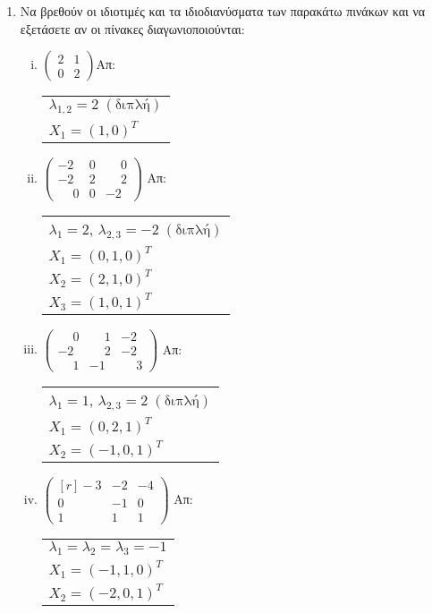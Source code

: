 \begin{enumerate}
\begin{enumerate}[i)]
\end{enumerate}

\item Να βρεθούν οι ιδιοτιμές και τα ιδιοδιανύσματα των παρακάτω πινάκων και να εξετάσετε αν οι πίνακες διαγωνιοποιούνται:

\begin{enumerate}[i)]

\item $\begin{pmatrix}
2 & 1 \\
0 & 2
\end{pmatrix}$\hfill Απ: \begin{tabular}{l}
$\lambda_{1,2}=2 \; (\text{διπλή})$ \\
$X_1=(1,0)^T$ \\
\end{tabular}

\item $\begin{pmatrix}
-2 & 0 & \phantom{-}0 \\
-2 & 2 & \phantom{-}2 \\
\phantom{-}0 & 0 & -2
\end{pmatrix}$ \hfill Απ: \begin{tabular}{l}
$\lambda_1=2$, $\lambda_{2,3}=-2 \; (\text{διπλή})$ \\ 
$X_1=(0,1,0)^T$ \\
$X_2=(2,1,0)^T$ \\
$X_3=(1,0,1)^T$
\end{tabular}



\item $\begin{pmatrix}
\phantom{-}0 & \phantom{-}1 & -2 \\
-2 & \phantom{-}2 & -2 \\
\phantom{-}1 & -1 & \phantom{-}3
\end{pmatrix}$ \hfill Απ: \begin{tabular}{l}
$\lambda_1=1$, $\lambda_{2,3}=2 \; (\text{διπλή})$ \\ 
$X_1=(0,2,1)^T$ \\
$X_2=(-1,0,1)^T$ \\
\end{tabular}

\item $ \begin{pmatrix*}[r]
		-3 & -2 & -4 \\
		0 & -1 & 0 \\
		1 & 1 & 1 
\end{pmatrix*}$ \hfill Απ: \begin{tabular}{l}
$ \lambda_{1} = \lambda_{2} = \lambda_{3} = -1 $ \\
$ X_{1} = (-1,1,0)^T$ \\
$ X_{2} = (-2,0,1)^{T} $
\end{tabular}


\end{enumerate}
\end{enumerate}
